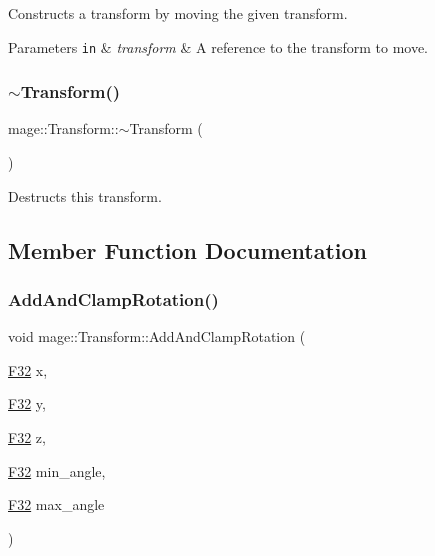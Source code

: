 Constructs a transform by moving the given transform.


\begin{DoxyParams}[1]{Parameters}
\mbox{\tt in}  & {\em transform} & A reference to the transform to move. \\
\hline
\end{DoxyParams}
\hypertarget{structmage_1_1_transform_a2da8c6542920e0748a504c32c54073f6}{}\label{structmage_1_1_transform_a2da8c6542920e0748a504c32c54073f6} 
\subsubsection{\texorpdfstring{$\sim$\+Transform()}{~Transform()}}
{\footnotesize\ttfamily mage\+::\+Transform\+::$\sim$\+Transform (\begin{DoxyParamCaption}{ }\end{DoxyParamCaption})\hspace{0.3cm}{\ttfamily [default]}}

Destructs this transform. 

\subsection{Member Function Documentation}
\hypertarget{structmage_1_1_transform_a7d71b079115dcfae2747191f786713e1}{}\label{structmage_1_1_transform_a7d71b079115dcfae2747191f786713e1} 
\subsubsection{\texorpdfstring{Add\+And\+Clamp\+Rotation()}{AddAndClampRotation()}\hspace{0.1cm}{\footnotesize\ttfamily [1/3]}}
{\footnotesize\ttfamily void mage\+::\+Transform\+::\+Add\+And\+Clamp\+Rotation (\begin{DoxyParamCaption}\item[{\hyperlink{namespacemage_aa97e833b45f06d60a0a9c4fc22ae02c0}{F32}}]{x,  }\item[{\hyperlink{namespacemage_aa97e833b45f06d60a0a9c4fc22ae02c0}{F32}}]{y,  }\item[{\hyperlink{namespacemage_aa97e833b45f06d60a0a9c4fc22ae02c0}{F32}}]{z,  }\item[{\hyperlink{namespacemage_aa97e833b45f06d60a0a9c4fc22ae02c0}{F32}}]{min\+\_\+angle,  }\item[{\hyperlink{namespacemage_aa97e833b45f06d60a0a9c4fc22ae02c0}{F32}}]{max\+\_\+angle }\end{DoxyParamCaption})\hspace{0.3cm}{\ttfamily [noexcept]}}


